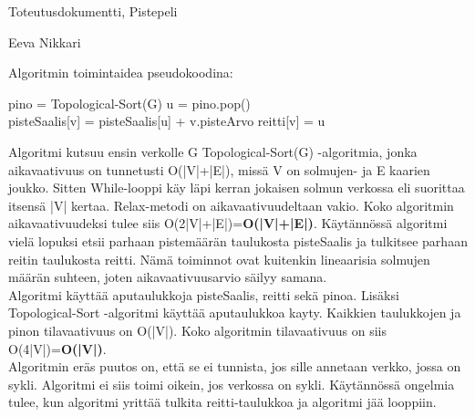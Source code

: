 \documentclass[12pt,a4paper,leqno]{amsart}
\begin{document}
\begin{flushleft}
				Toteutusdokumentti, Pistepeli
				\end{flushleft}				\begin{flushright}
				Eeva Nikkari
				\end{flushright}
				
				
Algoritmin toimintaidea pseudokoodina:
\begin{algorithm}
\begin{algorithmic}
	\State pino = Topological-Sort(G)
		\State u = pino.pop()
				\State {}
			\EndFor
	\EndWhile
\EndFunction
\\

\State pisteSaalis[v] = pisteSaalis[u] + v.pisteArvo
\State reitti[v] = u
\EndIf
\EndFunction
\end{algorithmic}
\end{algorithm}


Algoritmi kutsuu ensin verkolle G Topological-Sort(G) -algoritmia, jonka aikavaativuus on tunnetusti O(|V|+|E|), missä V on solmujen- ja E kaarien joukko. Sitten While-looppi käy läpi kerran jokaisen solmun verkossa eli suorittaa itsensä |V| kertaa. Relax-metodi on aikavaativuudeltaan vakio. Koko algoritmin aikavaativuudeksi tulee siis O(2|V|+|E|)=\textbf{O(|V|+|E|)}. Käytännössä algoritmi vielä lopuksi etsii parhaan pistemäärän taulukosta pisteSaalis ja tulkitsee parhaan reitin taulukosta reitti. Nämä toiminnot ovat kuitenkin lineaarisia solmujen määrän suhteen, joten aikavaativuusarvio säilyy samana.\\

Algoritmi käyttää aputaulukkoja pisteSaalis, reitti sekä pinoa. Lisäksi Topological-Sort -algoritmi käyttää aputaulukkoa kayty. Kaikkien taulukkojen ja pinon tilavaativuus on O(|V|). Koko algoritmin tilavaativuus on siis O(4|V|)=\textbf{O(|V|)}.\\

Algoritmin eräs puutos on, että se ei tunnista, jos sille annetaan verkko, jossa on sykli. Algoritmi ei siis toimi oikein, jos verkossa on sykli. Käytännössä ongelmia tulee, kun algoritmi yrittää tulkita reitti-taulukkoa ja algoritmi jää looppiin.
\end{document}
